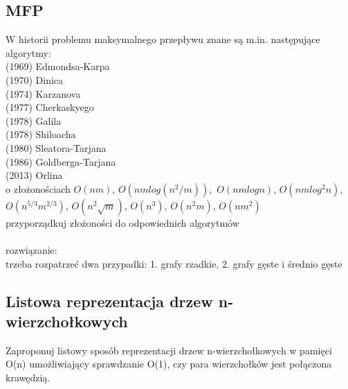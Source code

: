 \documentclass{article}
\begin{document}
\subsection*{MFP}
W historii problemu maksymalnego przepływu znane są m.in.  następujące algorytmy:\\
(1969) Edmondsa-Karpa \\
(1970) Dinica \\
(1974) Karzanova \\
(1977) Cherkaskyego \\
(1978) Galila \\
(1978) Shiloacha \\
(1980) Sleatora-Tarjana \\
(1986) Goldberga-Tarjana \\
(2013) Orlina \\
o złożonościach $O(nm)$, $O(nmlog(n^2/m)),$ $O(nmlogn)$, $O(nmlog^2n)$, $O(n^{5/3}m^{2/3})$, $O(n^2\sqrt m)$, $O(n^3)$, $O(n^2m)$, $O(nm^2)$ \\
przyporządkuj złożoności do odpowiednich algorytmów \\\\ rozwiązanie: \\
trzeba rozpatrzeć dwa przypadki: 1. grafy rzadkie, 2. grafy gęste i średnio gęste

\subsection*{Listowa reprezentacja drzew n-wierzchołkowych}
Zaproponuj listowy sposób reprezentacji drzew n-wierzchołkowych w pamięci O(n) umożliwiający sprawdzanie O(1), 
czy para wierzchołków jest połączona krawędzią. 
\end{document}
